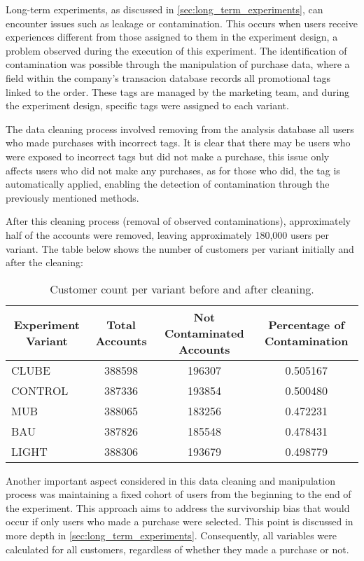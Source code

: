 Long-term experiments, as discussed in \ref{sec:long_term_experiments}, can encounter issues such as leakage or contamination. This occurs when users receive experiences different from those assigned to them in the 
experiment design, a problem observed during the execution of this experiment. The identification of contamination was possible through the manipulation of purchase data, where a field within the company's transacion 
database records all promotional tags linked to the order. These tags are managed by the marketing team, and during the experiment design, specific tags were assigned to each variant.

The data cleaning process involved removing from the analysis database all users who made purchases with incorrect tags. It is clear that there may be users who were exposed to incorrect tags but did not make a purchase, 
this issue only affects users who did not make any purchases, as for those who did, the tag is automatically applied, enabling the detection of contamination through the previously mentioned methods.

After this cleaning process (removal of observed contaminations), approximately half of the accounts were removed, leaving approximately 180,000 users per variant. The table below shows the number of customers per variant 
initially and after the cleaning:

\begin{table}[ht]
  \caption{Customer count per variant before and after cleaning.}
  \label{tab:customer-count}
\centering
\begin{adjustbox}{max width=\textwidth}
\begin{tabular}{lccc}
  \toprule
  \multicolumn{1}{c}{\textbf{Experiment Variant}} & \textbf{Total Accounts} & \textbf{Not Contaminated Accounts} & \textbf{Percentage of Contamination} \\
  \midrule
  CLUBE & 388598 & 196307 & 0.505167 \\
  CONTROL & 387336 & 193854 & 0.500480 \\
  MUB & 388065 & 183256 & 0.472231 \\
  BAU & 387826 & 185548 & 0.478431 \\
  LIGHT & 388306 & 193679 & 0.498779 \\
  \bottomrule
\end{tabular}
\end{adjustbox}
\end{table}

Another important aspect considered in this data cleaning and manipulation process was maintaining a fixed cohort of users from the beginning to the end of the experiment. This approach aims to address the survivorship bias 
that would occur if only users who made a purchase were selected. This point is discussed in more depth in \ref{sec:long_term_experiments}. Consequently, all variables were calculated for all customers, regardless
of whether they made a purchase or not.

